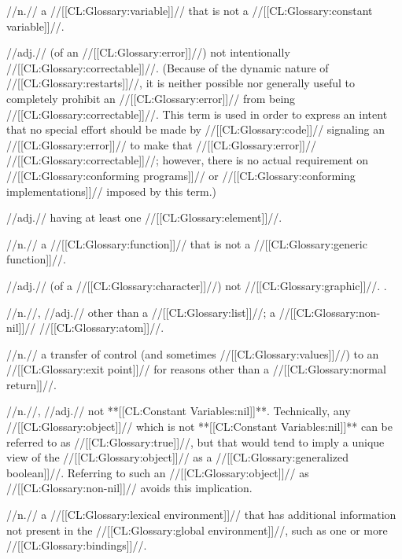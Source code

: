  //n.// a //[[CL:Glossary:variable]]// that is not a //[[CL:Glossary:constant variable]]//.

 //adj.// (of an //[[CL:Glossary:error]]//) not intentionally //[[CL:Glossary:correctable]]//. (Because of the dynamic nature of //[[CL:Glossary:restarts]]//, it is neither possible nor generally useful to completely prohibit an //[[CL:Glossary:error]]// from being //[[CL:Glossary:correctable]]//. This term is used in order to express an intent that no special effort should be made by //[[CL:Glossary:code]]// signaling an //[[CL:Glossary:error]]// to make that //[[CL:Glossary:error]]// //[[CL:Glossary:correctable]]//; however, there is no actual requirement on //[[CL:Glossary:conforming programs]]// or //[[CL:Glossary:conforming implementations]]// imposed by this term.)

 //adj.// having at least one //[[CL:Glossary:element]]//.


 //n.// a //[[CL:Glossary:function]]// that is not a //[[CL:Glossary:generic function]]//.

 //adj.// (of a //[[CL:Glossary:character]]//) not //[[CL:Glossary:graphic]]//. \Seesection\GraphicChars.

 //n.//, //adj.// other than a //[[CL:Glossary:list]]//; \ie a //[[CL:Glossary:non-nil]]// //[[CL:Glossary:atom]]//.

 //n.// a transfer of control (and sometimes //[[CL:Glossary:values]]//) to an //[[CL:Glossary:exit point]]// for reasons other than a //[[CL:Glossary:normal return]]//. 

 //n.//, //adj.// not **[[CL:Constant Variables:nil]]**. Technically, any //[[CL:Glossary:object]]// which is not **[[CL:Constant Variables:nil]]** can be referred to as //[[CL:Glossary:true]]//, but that would tend to imply a unique view of the //[[CL:Glossary:object]]// as a //[[CL:Glossary:generalized boolean]]//. Referring to such an //[[CL:Glossary:object]]// as //[[CL:Glossary:non-nil]]// avoids this implication.

 //n.// a //[[CL:Glossary:lexical environment]]// that has additional information not present in the //[[CL:Glossary:global environment]]//, such as one or more //[[CL:Glossary:bindings]]//.

